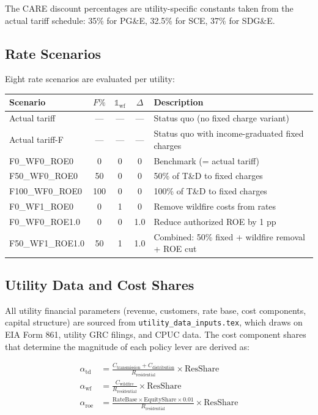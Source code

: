 \documentclass[11pt]{article}
\begin{document}
The CARE discount percentages are utility-specific constants taken from the actual tariff schedule: 35\% for PG\&E, 32.5\% for SCE, 37\% for SDG\&E.

\subsection{Rate Scenarios}

Eight rate scenarios are evaluated per utility:

\begin{table}[htbp]
\centering
\begin{tabular}{l c c c l}
\toprule
\textbf{Scenario} & $F\%$ & $\mathbb{1}_{\text{wf}}$ & $\Delta$ & \textbf{Description} \\
\midrule
Actual tariff & --- & --- & --- & Status quo (no fixed charge variant) \\
Actual tariff-F & --- & --- & --- & Status quo with income-graduated fixed charges \\
F0\_WF0\_ROE0 & 0 & 0 & 0 & Benchmark (= actual tariff) \\
F50\_WF0\_ROE0 & 50 & 0 & 0 & 50\% of T\&D to fixed charges \\
F100\_WF0\_ROE0 & 100 & 0 & 0 & 100\% of T\&D to fixed charges \\
F0\_WF1\_ROE0 & 0 & 1 & 0 & Remove wildfire costs from rates \\
F0\_WF0\_ROE1.0 & 0 & 0 & 1.0 & Reduce authorized ROE by 1 pp \\
F50\_WF1\_ROE1.0 & 50 & 1 & 1.0 & Combined: 50\% fixed + wildfire removal + ROE cut \\
\bottomrule
\end{tabular}
\end{table}

\subsection{Utility Data and Cost Shares}

All utility financial parameters (revenue, customers, rate base, cost components, capital structure) are sourced from \texttt{utility\_data\_inputs.tex}, which draws on EIA Form 861, utility GRC filings, and CPUC data. The cost component shares that determine the magnitude of each policy lever are derived as:

\begin{align}
    \alpha_{\text{td}} &= \frac{C_{\text{transmission}} + C_{\text{distribution}}}{R_{\text{residential}}} \times \text{ResShare} \\
    \alpha_{\text{wf}} &= \frac{C_{\text{wildfire}}}{R_{\text{residential}}} \times \text{ResShare} \\
    \alpha_{\text{roe}} &= \frac{\text{RateBase} \times \text{EquityShare} \times 0.01}{R_{\text{residential}}} \times \text{ResShare}
\end{align}
\end{document}
